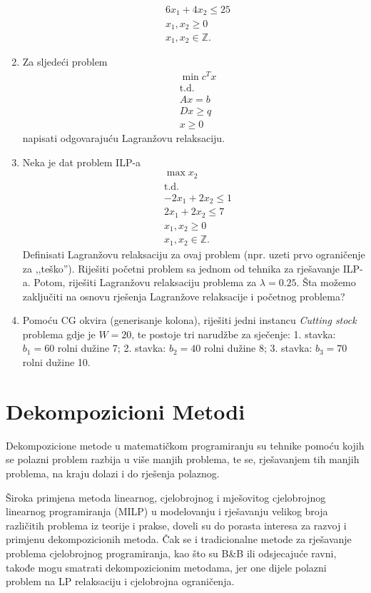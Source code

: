 \documentclass[a4paper, utf8, 11pt, colorlinks]{book}
\theoremstyle{definition}
\begin{document}
\begin{enumerate}
\begin{align*}
  	 & 6 x_1 + 4 x_2 \leq 25 \\
  	 & x_1, x_2 \geq 0 \\
  	 & x_1, x_2\in \mathbb{Z}.
  \end{align*}
\item  Za sljedeći problem 
\begin{align*}
	&\min c^T x \\
	&\mbox{t.d.}\\
	& Ax = b \\
	& D x \geq q \\
	& x \geq 0
\end{align*}
napisati odgovarajuću Lagranžovu relaksaciju. 
\item %
Neka je dat problem ILP-a
\begin{align*}
	&\max x_2 \\
    &\mbox{t.d.}\\
	& -2x_1 + 2x_2 \leq 1 \\
	& 2 x_1 + 2 x_2 \leq 7 \\
	& x_1, x_2 \geq 0 \\
	& x_1, x_2 \in \mathbb{Z}.
\end{align*}
Definisati Lagranžovu relaksaciju za ovaj problem (npr. uzeti prvo ograničenje za ,,teško''). Riješiti početni problem sa jednom od tehnika za rješavanje ILP-a. Potom, riješiti Lagranžovu relaksaciju problema za $\lambda=0.25$. Šta možemo zaključiti na osnovu rješenja Lagranžove relaksacije i početnog problema? 
\item   Pomoću CG okvira (generisanje kolona), riješiti jedni instancu \emph{Cutting stock} problema gdje je  
$W = 20$, te postoje tri narudžbe za sječenje: 1. stavka: $b_1=60$ rolni dužine 7; 2. stavka: $b_2=40$ rolni dužine 8; 3. stavka: $b_3=70$ rolni dužine 10. 

 \end{enumerate}
 
 
 \chapter{Dekompozicioni Metodi}
 
Dekompozicione metode u matematičkom programiranju su tehnike pomoću kojih se polazni problem  razbija u više manjih problema, te se, rješavanjem tih manjih problema, na kraju dolazi i do rješenja polaznog.

Široka primjena metoda linearnog, cjelobrojnog i mješovitog cjelobrojnog linearnog programiranja (MILP) u modelovanju i rješavanju velikog broja različitih problema iz teorije i prakse, doveli su do porasta interesa  za razvoj i primjenu  dekompozicionih metoda. Čak se i tradicionalne metode za rješavanje problema cjelobrojnog programiranja, kao što su B\&B  ili odsjecajuće ravni, takođe   mogu smatrati dekompozicionim metodama, jer one dijele polazni problem na LP relaksaciju i cjelobrojna ograničenja.
\end{document}
